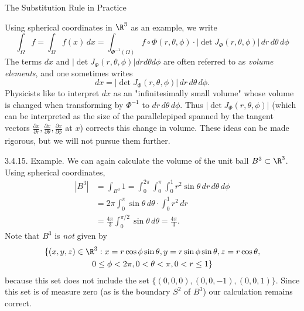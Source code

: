 \documentclass[smaller,hyperref={CJKbookmarks=true}]{beamer}
\begin{document}
\begin{frame}{The Substitution Rule in Practice}
\begin{spacing}{1.05}
Using spherical coordinates in $\R^3$ as an example, we write
\[\int_\Omega f=\int_\Omega f(x)\,dx=\int_{\Phi^{-1}(\Omega)}f\circ\Phi(r,\theta,\phi)\cdot
|\det J_\Phi(r,\theta,\phi)|\,dr\,d\theta\,d\phi\]
The terms $dx$ and $|\det J_\Phi(r,\theta,\phi)|drd\theta d\phi$ are often referred to as
\emph{volume elements}, and one sometimes writes
\[dx=|\det J_\Phi(r,\theta,\phi)|\,dr\,d\theta\,d\phi.\]
Physicists like to interpret $dx$ as an "infinitesimally small volume" whose volume is changed when transforming by $\Phi^{-1}$ to $dr\,d\theta\,d\phi$. Thus $|\det J_\Phi(r,\theta,\phi)|$ (which can be interpreted as the size of the parallelepiped spanned by the tangent vectors $\frac{\partial x}{\partial r},\frac{\partial x}{\partial\theta},\frac{\partial x}{\partial\phi}$ at $x$) corrects this change in volume. These ideas can be made rigorous, but we will not pursue them further.
\end{spacing}
\newpage
\begin{spacing}{0.7}
\alert{3.4.15. Example.} We can again calculate the volume of the unit ball $B^3\subset\R^3$. Using spherical coordinates,
\begin{equation*}
  \begin{split}
     |B^3| &=\int_{B^3}1=\int_{0}^{2\pi}\int_{0}^{\pi}
     \int_{0}^{1}r^2\sin\theta\,dr\,d\theta\,d\phi \\
       &=2\pi\int_{0}^{\pi}\sin\theta\,d\theta\cdot
       \int_{0}^{1}r^2\,dr \\
       &=\frac{4\pi}{3}\int_{0}^{\pi/2}\sin\theta\,d\theta=
       \frac{4\pi}{3}.
  \end{split}
\end{equation*}
Note that $B^3$ is \emph{not} given by
\begin{multline*}
  \{(x,y,z)\in\R^3:x=r\cos\phi\sin\theta,y=r\sin\phi\sin\theta,
  z=r\cos\theta, \\
  0\leq\phi<2\pi,0<\theta<\pi,0<r\leq1\}
\end{multline*}
because this set does not include the set $\{(0,0,0),(0,0,-1),(0,0,1)\}$. Since this set is of measure zero (as is the boundary $S^2$ of $B^3$) our calculation remains correct.
\end{spacing}
\end{frame}
\end{document}
